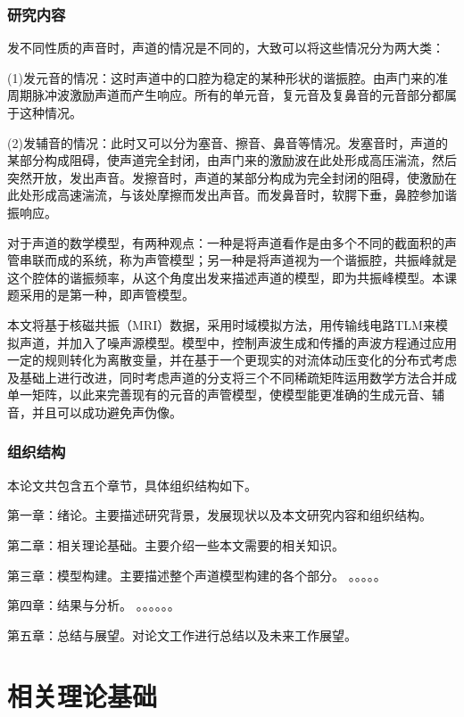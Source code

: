 \subsection{研究内容}
发不同性质的声音时，声道的情况是不同的，大致可以将这些情况分为两大类：



(1)发元音的情况：这时声道中的口腔为稳定的某种形状的谐振腔。由声门来的准周期脉冲波激励声道而产生响应。所有的单元音，复元音及复鼻音的元音部分都属于这种情况。

(2)发辅音的情况：此时又可以分为塞音、擦音、鼻音等情况。发塞音时，声道的某部分构成阻碍，使声道完全封闭，由声门来的激励波在此处形成高压湍流，然后突然开放，发出声音。发擦音时，声道的某部分构成为完全封闭的阻碍，使激励在此处形成高速湍流，与该处摩擦而发出声音。而发鼻音时，软腭下垂，鼻腔参加谐振响应。




对于声道的数学模型，有两种观点：一种是将声道看作是由多个不同的截面积的声管串联而成的系统，称为声管模型；另一种是将声道视为一个谐振腔，共振峰就是这个腔体的谐振频率，从这个角度出发来描述声道的模型，即为共振峰模型。本课题采用的是第一种，即声管模型。


本文将基于核磁共振（MRI）数据，采用时域模拟方法，用传输线电路TLM来模拟声道，并加入了噪声源模型。模型中，控制声波生成和传播的声波方程通过应用一定的规则转化为离散变量，并在基于一个更现实的对流体动压变化的分布式考虑及基础上进行改进，同时考虑声道的分支将三个不同稀疏矩阵运用数学方法合并成单一矩阵，以此来完善现有的元音的声管模型，使模型能更准确的生成元音、辅音，并且可以成功避免声伪像。


\subsection{组织结构}
本论文共包含五个章节，具体组织结构如下。


第一章：绪论。主要描述研究背景，发展现状以及本文研究内容和组织结构。


第二章：相关理论基础。主要介绍一些本文需要的相关知识。


第三章：模型构建。主要描述整个声道模型构建的各个部分。 。。。。。


第四章：结果与分析。   。。。。。。


第五章：总结与展望。对论文工作进行总结以及未来工作展望。


\chapter{相关理论基础}

